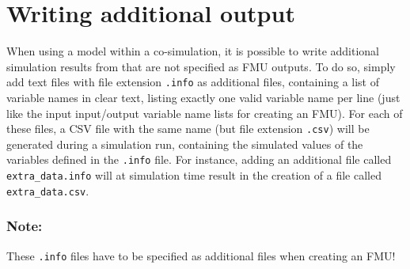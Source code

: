 \chapter{Writing additional output}
\label{sec:additional_output}

When using a \pf model within a co-simulation, it is possible to write additional simulation results from \pf that are not specified as FMU outputs.
To do so, simply add text files with file extension \texttt{.info} as additional files, containing a list of variable names in clear text, listing exactly one valid variable name per line (just like the input input/output variable name lists for creating an FMU).
For each of these files, a CSV file with the same name (but file extension \texttt{.csv}) will be generated during a simulation run, containing the simulated values of the variables defined in the \texttt{.info} file.
For instance, adding an additional file called \texttt{extra\_data.info} will at simulation time result in the creation of a file called \texttt{extra\_data.csv}.

\subsection*{Note:}
These \texttt{.info} files have to be specified as additional files when creating an FMU!